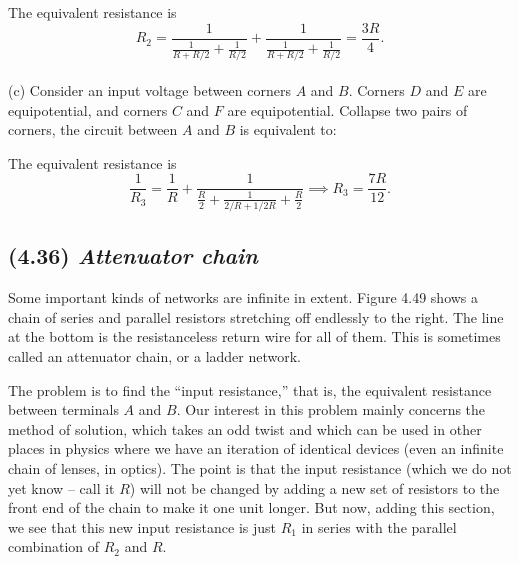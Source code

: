 \documentclass[hidelinks]{article}
\begin{document}
The equivalent resistance is
$$R_2 = \frac{1}{\frac{1}{R+R/2}+\frac{1}{R/2}}+\frac{1}{\frac{1}{R+R/2}+\frac{1}{R/2}} = \frac{3R}{4}.$$\\[3mm]
(c) Consider an input voltage between corners $A$ and $B$. Corners $D$ and $E$ are equipotential, and corners $C$ and $F$ are equipotential. Collapse two pairs of corners, the circuit between $A$ and $B$ is equivalent to:
\begin{center}
\end{center}
The equivalent resistance is
$$\frac{1}{R_3} = \frac{1}{R} + \frac{1}{\frac{R}{2}+ \frac{1}{2/R+1/2R} +\frac{R}{2}  } \implies R_3 = \frac{7R}{12}.$$

\subsection{(4.36) \textit{Attenuator chain}}
Some important kinds of networks are infinite in extent. Figure 4.49 shows a chain of series and parallel resistors stretching off endlessly to the right. The line at the bottom is the resistanceless return wire for all of them. This is sometimes called an attenuator chain, or a ladder network. 

The problem is to find the “input resistance,” that is, the equivalent resistance between terminals $A$ and $B$. Our interest in this problem mainly concerns the method of solution, which takes an odd twist and which can be used in other places in physics where we have an iteration of identical devices (even an infinite chain of lenses, in optics). The point is that the input resistance (which we do not yet know – call it $R$) will not be changed by adding a new set of resistors to the front end of the chain to make it one unit longer. But now, adding this section, we see that this new input resistance is just $R_1$ in series with the parallel combination of $R_2$ and $R$.
\end{document}
